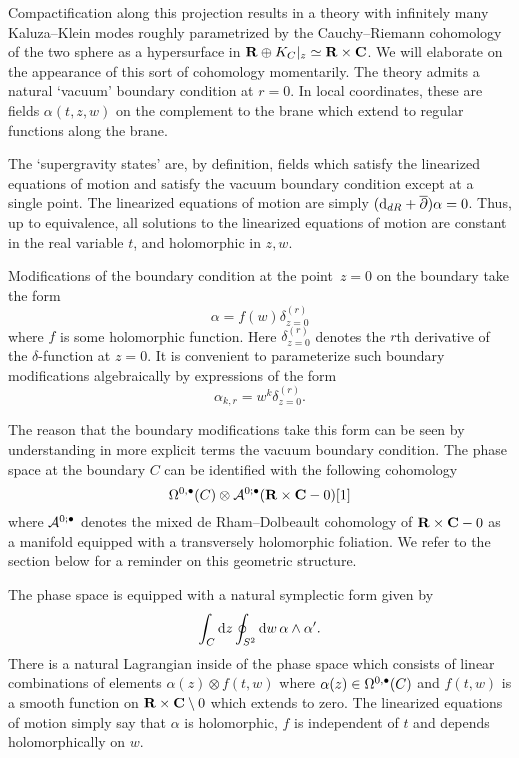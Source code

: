 \documentclass[11pt]{amsart}%
\begin{document}
Compactification along this projection results in a theory with infinitely many Kaluza--Klein modes roughly parametrized by the Cauchy--Riemann cohomology of the two sphere as a hypersurface in $\mathbf{R} \oplus K_C|_z \simeq \mathbf{R} \times \mathbf{C}$. 
We will elaborate on the appearance of this sort of cohomology momentarily.
The theory admits a natural `vacuum' boundary condition at $r=0$.
In local coordinates, these are fields $\alpha(t,z,w)$ on the complement to the brane which extend to regular functions along the brane.

The `supergravity states' are, by definition, fields which satisfy the linearized equations of motion and satisfy the vacuum boundary condition except at a single point. 
The linearized equations of motion are simply $({\rm d}_{dR} + \overline{\partial}) \alpha = 0$. 
Thus, up to equivalence, all solutions to the linearized equations of motion are constant in the real variable $t$, and holomorphic in $z,w$. 

Modifications of the boundary condition at the point~$z = 0$ on the boundary take the form
\[
\alpha = f(w) \delta^{(r)}_{z=0} 
\]
where $f$ is some holomorphic function. 
Here $\delta^{(r)}_{z=0}$ denotes the $r$th derivative of the $\delta$-function at $z=0$. 
It is convenient to parameterize such boundary modifications algebraically by expressions of the form 
\[
\alpha_{k,r} = w^k \delta^{(r)}_{z=0} .
\]

The reason that the boundary modifications take this form can be seen by understanding in more explicit terms the vacuum boundary condition.
The phase space at the boundary $C$ can be identified with the following cohomology
\[
\Omega^{0,\bullet}(C) \otimes \mathcal A^{0;\bullet}(\mathbf{R} \times \mathbf{C} - 0) [1]
\]
where $\mathcal A^{0;\bullet}$ denotes the mixed de Rham--Dolbeault cohomology of $\mathbf{R} \times \mathbf{C} - 0$ as a manifold equipped with a transversely holomorphic foliation. 
We refer to the section below for a reminder on this geometric structure.

The phase space is equipped with a natural symplectic form given by
\[
\int_C {\rm d} z \oint_{S^2} {\rm d} w \, \alpha \wedge \alpha' .
\]
There is a natural Lagrangian inside of the phase space which consists of linear combinations of elements $\alpha(z) \otimes f(t,w)$ where $\alpha(z) \in \Omega^{0,\bullet}(C)$ and $f(t,w)$ is a smooth function on $\mathbf{R} \times \mathbf{C} \setminus 0$ which extends to zero. 
The linearized equations of motion simply say that $\alpha$ is holomorphic, $f$ is independent of $t$ and depends holomorphically on $w$.

\end{document}

